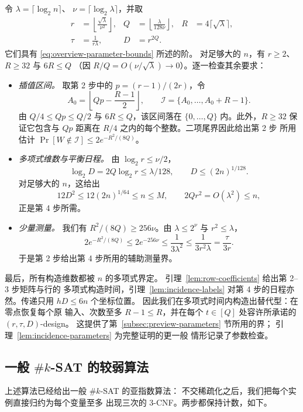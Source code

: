 \documentclass[11pt,reqno]{amsart}
\numberwithin{equation}{section}
\theoremstyle{definition}\newtheorem{definition}[theorem]{定义}
\theoremstyle{remark}\newtheorem{remark}[theorem]{注}
\renewcommand{\le}{\leqslant}
\renewcommand{\ge}{\geqslant}
\begin{document}
令 $\lambda=\lceil\log_2 n\rceil$、
$\nu=\lceil\log_2\lambda\rceil$，并取
\begin{equation}\label{eq:overview-explicit-parameters}
 \begin{aligned}
 r&=\left\lfloor\frac{\sqrt\lambda}{\nu^2}\right\rfloor,
 &Q&=\left\lfloor\frac{\lambda}{128\nu}\right\rfloor,
 &R&=4\lceil\sqrt\lambda\rceil,\\
 \tau&=\frac1{r\lambda},
 &D&=r^{2Q}.
 \end{aligned}
\end{equation}
它们具有 \eqref{eq:overview-parameter-bounds} 所述的阶。
对足够大的 $n$，有 $r\ge2$、$R\ge32$ 与 $6R\le Q$
（因 $R/Q=O(\nu/\sqrt\lambda)\to0$）。逐一检查其余要求：
\begin{itemize}
\item \emph{插值区间。}
取第 2 步中的 $p=(r-1)/(2r)$，令
\[
 A_0=\left\lfloor Qp-\frac{R-1}{2}\right\rfloor,\qquad
 \mathcal I=\{A_0,\ldots,A_0+R-1\}.
\]
由 $Q/4\le Qp\le Q/2$ 与 $6R\le Q$，该区间落在
$\{0,\ldots,Q\}$ 内。此外，$R\ge32$ 保证它包含与 $Qp$
距离在 $R/4$ 之内的每个整数。二项尾界因此给出第 2 步
所用估计 $\Pr[W\notin\mathcal I]\le2e^{-R^2/(8Q)}$。
\item \emph{多项式维数与平衡日程。}
由 $\log_2 r\le\nu/2$，
\[
 \log_2 D=2Q\log_2 r\le\lambda/128,\qquad
 D\le(2n)^{1/128}.
\]
对足够大的 $n$，这给出
\[
 12D^2\le12(2n)^{1/64}\le n\le M,\qquad
 2Qr^2=O(\lambda^2)\le n,
\]
正是第 4 步所需。
\item \emph{少量测量。}
我们有 $R^2/(8Q)\ge256\nu$。由 $\lambda\le2^\nu$ 与
$r^2\le\lambda$，
\[
 2e^{-R^2/(8Q)}\le2e^{-256\nu}
 \le\frac1{3\lambda^2}
 \le\frac1{3r^2\lambda}=\frac{\tau}{3r}.
\]
于是第 2 步给出第 4 步所用的辅助测量界。
\end{itemize}

最后，所有构造维数都被 $n$ 的多项式界定。
引理~\ref{lem:row-coefficients} 给出第 2--3 步矩阵与行的
多项式构造时间，引理~\ref{lem:incidence-labels}
对第 4 步的日程亦然。传递只用 $hD\le6n$ 个坐标位置。
因此我们在多项式时间内构造出替代型：在零点恢复每个原
输入、次数至多 $R-1\le R$，并在每个 $t\in[Q]$
处容许所承诺的 $(r,\tau,D)$-design。
这提供了第~\ref{subsec:preview-parameters} 节所用的界；
引理~\ref{lem:incidence-parameters} 为完整证明的更一般
情形记录了参数检查。

\subsection{一般 \texorpdfstring{$\#k$-SAT}{\#k-SAT} 的较弱算法}
\label{subsec:preview-general-sat}
上述算法已经给出一般 $\#k$-SAT 的亚指数算法：
不交稀疏化之后，我们把每个实例直接归约为每个变量至多
出现三次的 $3$-CNF。两步都保持计数，如下。
\end{document}
